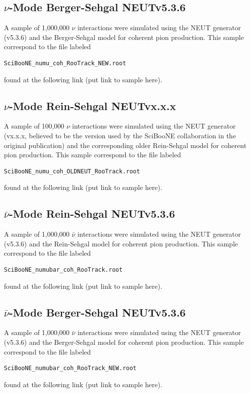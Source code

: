 \documentclass[11pt]{article}
\begin{document}
\subsection{$\nu$-Mode Berger-Sehgal NEUTv5.3.6}
A sample of 1,000,000 $\nu$ interactions were simulated using the NEUT generator (v5.3.6) and the Berger-Sehgal model for coherent pion production. This sample correspond to the file labeled
\begin{verbatim}
SciBooNE_numu_coh_RooTrack_NEW.root
\end{verbatim}
found at the following link (put link to sample here).



\subsection{$\nu$-Mode Rein-Sehgal NEUTvx.x.x}
A sample of 100,000 $\nu$ interactions were simulated using the NEUT generator (vx.x.x, believed to be the version used by the SciBooNE collaboration in the original publication) and the corresponding older Rein-Sehgal model for coherent pion production. This sample correspond to the file labeled
\begin{verbatim}
SciBooNE_numu_coh_OLDNEUT_RooTrack.root
\end{verbatim}
found at the following link (put link to sample here).


\subsection{$\bar{\nu}$-Mode Rein-Sehgal NEUTv5.3.6}
A sample of 1,000,000 $\bar{\nu}$ interactions were simulated using the NEUT generator (v5.3.6) and the Rein-Sehgal model for coherent pion production. This sample correspond to the file labeled
\begin{verbatim}
SciBooNE_numubar_coh_RooTrack.root
\end{verbatim}
found at the following link (put link to sample here).

\subsection{$\bar{\nu}$-Mode Berger-Sehgal NEUTv5.3.6}
A sample of 1,000,000 $\bar{\nu}$ interactions were simulated using the NEUT generator (v5.3.6) and the Berger-Sehgal model for coherent pion production. This sample correspond to the file labeled
\begin{verbatim}
SciBooNE_numubar_coh_RooTrack_NEW.root
\end{verbatim}
found at the following link (put link to sample here).
\end{document}

